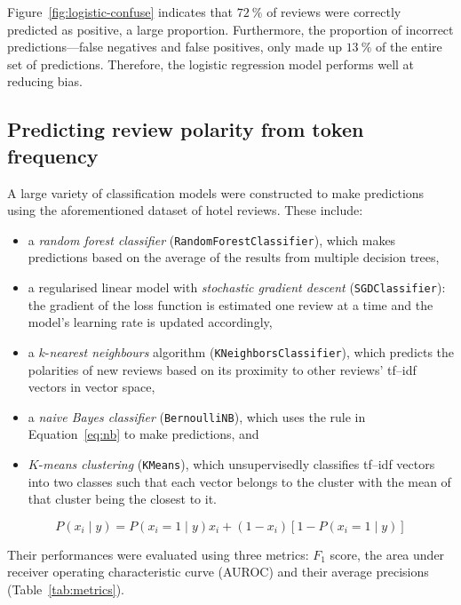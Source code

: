 \documentclass[12pt, a4paper, oneside]{pancake-article}
\begin{document}
Figure~\ref{fig:logistic-confuse} indicates that $\qty{72}{\percent}$
of reviews were correctly predicted as positive, a large proportion.
Furthermore, the proportion of incorrect predictions---false
negatives and false positives, only made up
$\qty{13}{\percent}$ of the entire set of predictions. Therefore, the
logistic regression model performs
well at reducing bias.

\subsection{Predicting review polarity from token frequency}

A large variety of classification models were constructed to make
predictions using the aforementioned
dataset of hotel reviews. These include:

\begin{itemize}
  \item a \textit{random forest classifier}
    (\texttt{RandomForestClassifier}), which makes predictions based
    on the average of the results from multiple decision trees,
  \item a regularised linear model with \textit{stochastic gradient
    descent} (\texttt{SGDClassifier}): the gradient of the loss
    function is estimated one review at a time and the model's
    learning rate is updated accordingly,
  \item a $k$-\textit{nearest neighbours} algorithm
    (\texttt{KNeighborsClassifier}), which predicts the polarities of
    new reviews based on its proximity to other reviews' tf--idf
    vectors in vector space,
  \item a \textit{naive Bayes classifier} (\texttt{BernoulliNB}),
    which uses the rule in Equation~\ref{eq:nb} to make predictions, and
  \item $K$-\textit{means clustering} (\texttt{KMeans}), which
    unsupervisedly classifies tf--idf vectors into two classes such
    that each vector belongs to the cluster with the mean of that
    cluster being the closest to it.
\end{itemize}

\begin{equation}
  P\left(x_i \mid y \right) = P\left(x_i = 1 \mid y\right)x_i + \left(1 -
  x_i\right)\left[1 - P\left(x_i=1\mid y\right)\right]
  \label{eq:nb}
\end{equation}

Their performances were evaluated using three metrics: $F_1$ score,
the area under receiver operating characteristic
curve (AUROC) and their average precisions (Table~\ref{tab:metrics}).
\end{document}
